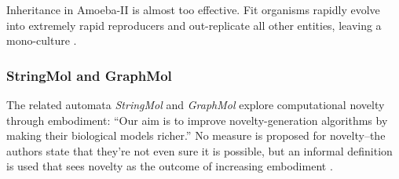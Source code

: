 Inheritance in Amoeba-II is almost too effective. Fit organisms rapidly evolve into extremely rapid reproducers and out-replicate all other entities, leaving a mono-culture \parencite{Pargellis2001}.

%
%
%
%
\subsubsection{StringMol and GraphMol}

The related automata \emph{StringMol} \parencite{Hickinbotham2011} and \emph{GraphMol} \parencite{Nellis2012, Nellis2014} explore computational novelty through embodiment: ``Our aim is to improve novelty-generation algorithms by making their biological models richer.'' No measure is proposed for novelty--the authors state that they're not even sure it is possible, but an informal definition is used that sees novelty as the outcome of increasing embodiment \parencite[p.87]{Nellis2012}. 

